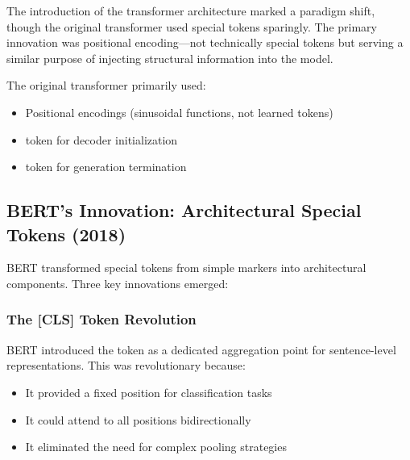 The introduction of the transformer architecture \citep{vaswani2017attention} marked a paradigm shift, though the original transformer used special tokens sparingly. The primary innovation was positional encoding---not technically special tokens but serving a similar purpose of injecting structural information into the model.

\begin{example}
The original transformer primarily used:
\begin{itemize}
\item Positional encodings (sinusoidal functions, not learned tokens)
\item {} token for decoder initialization
\item {} token for generation termination
\end{itemize}
\end{example}

\subsection{BERT's Innovation: Architectural Special Tokens (2018)}

BERT \citep{devlin2018bert} transformed special tokens from simple markers into architectural components. Three key innovations emerged:

\subsubsection{The [CLS] Token Revolution}
BERT introduced the \cls{} token as a dedicated aggregation point for sentence-level representations. This was revolutionary because:
\begin{itemize}
\item It provided a fixed position for classification tasks
\item It could attend to all positions bidirectionally
\item It eliminated the need for complex pooling strategies
\end{itemize}


